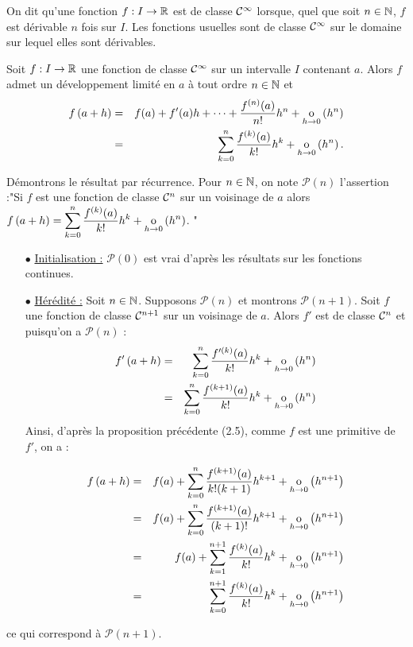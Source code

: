 \documentclass{magnolia}
\begin{document}
On dit qu'une fonction $f:I\to\mathbb{R}$ est de classe $\mathcal{C}^{\infty}$ lorsque, quel que
soit $n\in\mathbb{N}$, $f$ est dérivable $n$ fois sur $I$. Les fonctions usuelles sont
de classe $\mathcal{C}^{\infty}$ sur le domaine sur lequel elles sont dérivables.

\begin{proposition}[utile=-3,nom={Formule de \nom{Taylor-Young}}]
Soit $f:I\to\mathbb{R}$ une fonction de classe $\mathcal{C}^{\infty}$ sur un intervalle $I$ contenant
$a$. Alors $f$ admet un développement limité en $a$ à tout ordre $n\in\mathbb{N}$
et
\begin{eqnarray*}
f\left(a+h\right) &=& f(a)+f'(a)h+\cdots+\frac{f^{(n)}(a)}{n!}h^n+
  \underset{h \rightarrow 0}{\text{o}}\left(h^n\right)\\
  &=& \sum_{k=0}^n \frac{f^{(k)}(a)}{k!}h^k + \underset{h \rightarrow 0}{\text{o}}\left(h^n\right).
\end{eqnarray*}
\end{proposition}

\begin{preuve}
Démontrons le résultat par récurrence. Pour $n\in \mathbb{N}$, on note $\mathcal{P}(n)$ l'assertion :"Si $f$ est une fonction de classe $\mathcal{C}^{n}$ sur un voisinage de 
$a$ alors $f\left(a+h\right)=\displaystyle\sum_{k=0}^n \frac{f^{(k)}(a)}{k!}h^k + \underset{h \rightarrow 0}{\text{o}}\left(h^n\right)$. "

\begin{itemize}
\item[$\bullet$]\underline{Initialisation :} $\mathcal{P}(0)$ est vrai d'après les résultats sur les fonctions continues.
\item[$\bullet$]\underline{Hérédité :} Soit $n\in\mathbb{N}$. Supposons $\mathcal{P}(n)$ et montrons $\mathcal{P}(n+1)$. Soit $f$ une fonction de classe $\mathcal{C}^{n+1}$ sur un voisinage de $a$. Alors $f'$ est de classe $\mathcal{C}^{n}$ et puisqu'on a $\mathcal{P}(n)$ :
\begin{eqnarray*}
f'\left(a+h\right)&=&\displaystyle\sum_{k=0}^n \frac{f'^{(k)}(a)}{k!}h^k + \underset{h \rightarrow 0}{\text{o}}\left(h^n\right)\\
&=&\displaystyle\sum_{k=0}^n \frac{f^{(k+1)}(a)}{k!}h^k + \underset{h \rightarrow 0}{\text{o}}\left(h^n\right)
\end{eqnarray*}
Ainsi, d'après la proposition précédente (2.5), comme $f$ est une primitive de $f'$, on a : 

\begin{eqnarray*}
f\left(a+h\right)&=&f(a)+\displaystyle\sum_{k=0}^n \frac{f^{(k+1)}(a)}{k!(k+1)}h^{k+1} + \underset{h \rightarrow 0}{\text{o}}\left(h^{n+1}\right)\\
&=&f(a)+\displaystyle\sum_{k=0}^n \frac{f^{(k+1)}(a)}{(k+1)!}h^{k+1} + \underset{h \rightarrow 0}{\text{o}}\left(h^{n+1}\right)\\
&=&f(a)+\displaystyle\sum_{k=1}^{n+1} \frac{f^{(k)}(a)}{k!}h^{k} + \underset{h \rightarrow 0}{\text{o}}\left(h^{n+1}\right)\\
&=&\displaystyle\sum_{k=0}^{n+1} \frac{f^{(k)}(a)}{k!}h^{k} + \underset{h \rightarrow 0}{\text{o}}\left(h^{n+1}\right)
\end{eqnarray*}
\end{itemize}
ce qui correspond à $\mathcal{P}(n+1)$.
\end{preuve}
\end{document}
